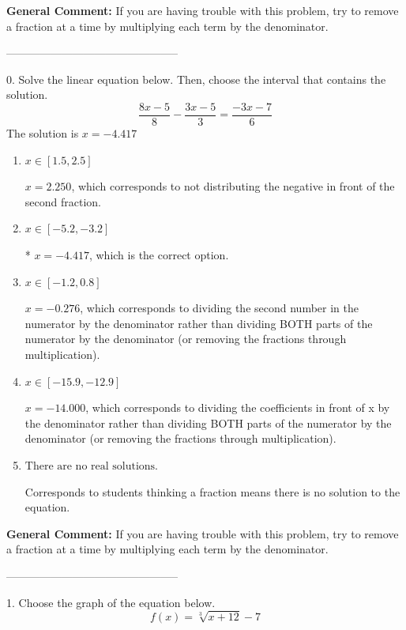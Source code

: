 \documentclass{extbook}[14pt]
\begin{document}
\textbf{General Comment:} If you are having trouble with this problem, try to remove a fraction at a time by multiplying each term by the denominator. 

-----------------------------------------------

0. Solve the linear equation below. Then, choose the interval that contains the solution.
\[ \frac{8x -5}{8} - \frac{3x -5}{3} = \frac{-3x -7}{6} \] 
The solution is $ x = -4.417 $ 

\begin{enumerate}[label=\Alph*.] 
\item $ x \in [1.5, 2.5] $ 

  $x = 2.250$, which corresponds to not distributing the negative in front of the second fraction. 
\item $ x \in [-5.2, -3.2] $ 

 * $x = -4.417$, which is the correct option. 
\item $ x \in [-1.2, 0.8] $ 

  $x = -0.276$, which corresponds to dividing the second number in the numerator by the denominator rather than dividing BOTH parts of the numerator by the denominator (or removing the fractions through multiplication). 
\item $ x \in [-15.9, -12.9] $ 

  $x = -14.000$, which corresponds to dividing the coefficients in front of x by the denominator rather than dividing BOTH parts of the numerator by the denominator (or removing the fractions through multiplication). 
\item $ \text{There are no real solutions.} $ 

 Corresponds to students thinking a fraction means there is no solution to the equation. 
\end{enumerate} 
 
\textbf{General Comment:} If you are having trouble with this problem, try to remove a fraction at a time by multiplying each term by the denominator. 

-----------------------------------------------

1. Choose the graph of the equation below.
\[ f(x) = \sqrt[3]{x + 12} - 7 \] 
\end{document}
